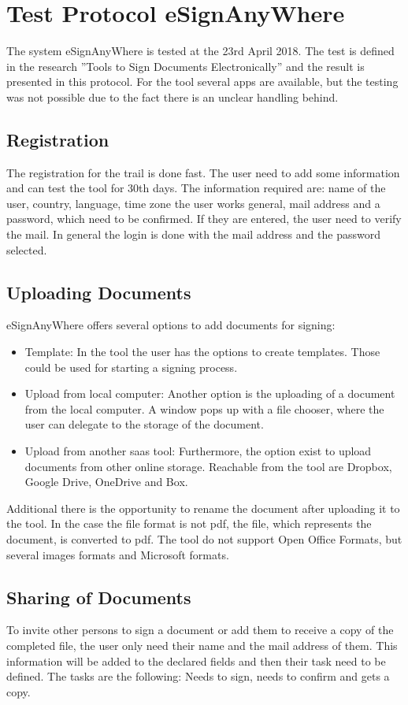 \section{Test Protocol eSignAnyWhere}
\label{sec:signAny}
The system eSignAnyWhere is tested at the 23rd April 2018. The test is defined in the research ''Tools to Sign Documents Electronically'' and the result is presented in this protocol. For the tool several \glspl{app} are available, but the testing was not possible due to the fact there is an unclear handling behind.

\subsection{Registration}
The registration for the trail is done fast. The user need to add some information and can test the tool for 30th days. The information required are: name of the user, country, language, time zone the user works general, mail address and a password, which need to be confirmed. If they are entered, the user need to verify the mail.
In general the login is done with the mail address and the password selected.

\subsection{Uploading Documents}
eSignAnyWhere offers several options to add documents for signing:
\begin{itemize}
	\item Template: In the tool the user has the options to create templates. Those could be used for starting a signing process.
	\item Upload from local computer: Another option is the uploading of a document from the local computer. A window pops up with a file chooser, where the user can delegate to the storage of the document. 
	\item Upload from another \gls{saas} tool: Furthermore, the option exist to upload documents from other online storage. Reachable from the tool are Dropbox, Google Drive, OneDrive and Box.
\end{itemize}
Additional there is the opportunity to rename the document after uploading it to the tool. In the case the file format is not \gls{pdf}, the file, which represents the document, is converted to \gls{pdf}. The tool do not support Open Office Formats, but several images formats and Microsoft formats.

\subsection{Sharing of Documents}
To invite other persons to sign a document or add them to receive a copy of the completed file, the user only need their name and the mail address of them. This information will be added to the declared fields and then their task need to be defined. The tasks are the following: Needs to sign, needs to confirm and gets a copy.

